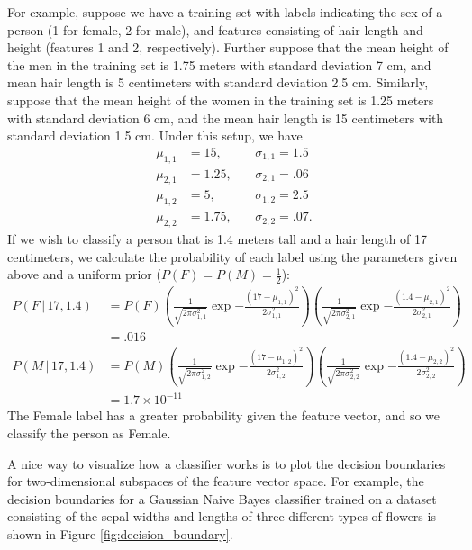 For example, suppose we have a training set with labels indicating the sex of a person (1 for female, 2 for male), and  features consisting of hair length and height (features 1 and 2, respectively).
Further suppose that the mean height of the men in the training set is 1.75 meters with standard deviation 7 cm, and mean hair length is 5 centimeters with standard deviation 2.5 cm.
Similarly, suppose that the mean height of the women in the training set is 1.25 meters with standard deviation 6 cm, and the mean hair length is 15 centimeters with standard deviation 1.5 cm.
Under this setup, we have
\begin{align*}
\mu_{1,1} &= 15, \quad &&\sigma_{1,1} = 1.5\\
\mu_{2,1} &= 1.25, &&\sigma_{2,1} = .06\\
\mu_{1,2} &= 5, &&\sigma_{1,2} = 2.5\\
\mu_{2,2} &= 1.75, &&\sigma_{2,2} = .07.
\end{align*}
If we wish to classify a person that is 1.4 meters tall and a hair length of 17 centimeters, we calculate the probability of each label using the parameters given above and a uniform prior ($P(F) = P(M) = \frac{1}{2}$):
\begin{align*}
P(F\,|\,17,1.4) &= P(F)\left(\frac{1}{\sqrt{2\pi\sigma_{1,1}^2}}\exp{-\frac{(17-\mu_{1,1})^2}{2\sigma^2_{1,1}}}\right)
\left(\frac{1}{\sqrt{2\pi\sigma_{2,1}^2}}\exp{-\frac{(1.4-\mu_{2,1})^2}{2\sigma^2_{2,1}}}\right)\\
&= .016\\
P(M\,|\,17,1.4) &= P(M)\left(\frac{1}{\sqrt{2\pi\sigma_{1,2}^2}}\exp{-\frac{(17-\mu_{1,2})^2}{2\sigma^2_{1,2}}}\right)
\left(\frac{1}{\sqrt{2\pi\sigma_{2,2}^2}}\exp{-\frac{(1.4-\mu_{2,2})^2}{2\sigma^2_{2,2}}}\right)\\
&= 1.7\times 10^{-11}
\end{align*}
The Female label has a greater probability given the feature vector, and so we classify the person as Female.

A nice way to visualize how a classifier works is to plot the decision boundaries for two-dimensional subspaces of the
feature vector space.
For example, the decision boundaries for a Gaussian Naive Bayes classifier trained on a dataset consisting of the
sepal widths and lengths of three different types of flowers is shown in Figure \ref{fig:decision_boundary}.

